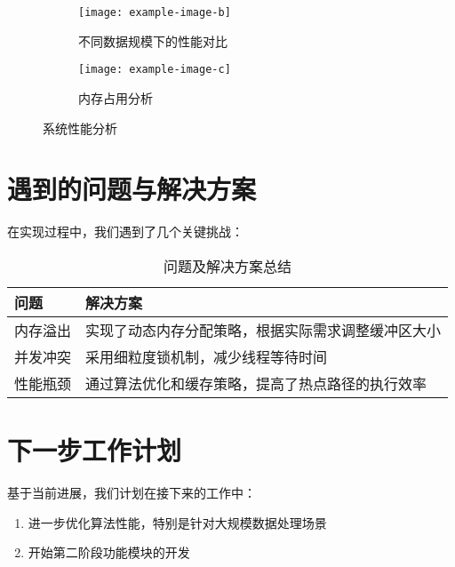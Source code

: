 \documentclass{article}
\begin{document}
\begin{figure}[h]
\centering
\begin{subfigure}{0.48\textwidth}
\centering
\texttt{[image: example-image-b]}
\caption{不同数据规模下的性能对比}
\label{fig:scale_performance}
\end{subfigure}
\hfill
\begin{subfigure}{0.48\textwidth}
\centering
\texttt{[image: example-image-c]}
\caption{内存占用分析}
\label{fig:memory_usage}
\end{subfigure}
\caption{系统性能分析}
\label{fig:performance_comparison}
\end{figure}

\section{遇到的问题与解决方案}

在实现过程中，我们遇到了几个关键挑战：

\begin{table}[h]
\centering
\caption{问题及解决方案总结}
\begin{tabular}{|p{}|p{}|}
\hline
\textbf{问题} & \textbf{解决方案} \\
\hline
内存溢出 & 实现了动态内存分配策略，根据实际需求调整缓冲区大小 \\
\hline
并发冲突 & 采用细粒度锁机制，减少线程等待时间 \\
\hline
性能瓶颈 & 通过算法优化和缓存策略，提高了热点路径的执行效率 \\
\hline
\end{tabular}

\label{tab:problems_solutions}
\end{table}

\section{下一步工作计划}

基于当前进展，我们计划在接下来的工作中：

\begin{enumerate}
\item 进一步优化算法性能，特别是针对大规模数据处理场景 \cite{ctex2020manual}
\item 开始第二阶段功能模块的开发 \cite{mittelbach2004latex}
\end{enumerate}



\end{document}
